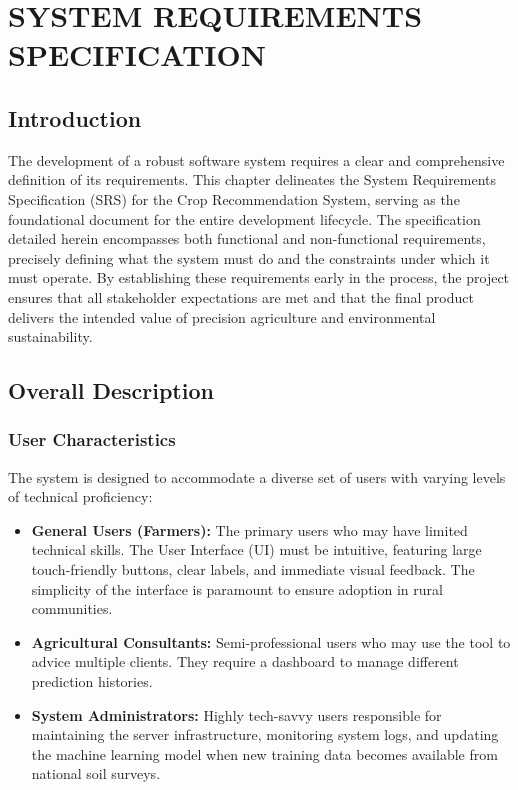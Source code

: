 \documentclass[12pt,a4paper]{report}
\begin{document}
\chapter{SYSTEM REQUIREMENTS SPECIFICATION}
\label{ch:3}

\section{Introduction}
\label{sec:3.1}
The development of a robust software system requires a clear and comprehensive definition of its requirements. This chapter delineates the System Requirements Specification (SRS) for the Crop Recommendation System, serving as the foundational document for the entire development lifecycle. The specification detailed herein encompasses both functional and non-functional requirements, precisely defining what the system must do and the constraints under which it must operate. By establishing these requirements early in the process, the project ensures that all stakeholder expectations are met and that the final product delivers the intended value of precision agriculture and environmental sustainability.

\section{Overall Description}
\subsection{User Characteristics}
The system is designed to accommodate a diverse set of users with varying levels of technical proficiency:
\begin{itemize}
    \item \textbf{General Users (Farmers):} The primary users who may have limited technical skills. The User Interface (UI) must be intuitive, featuring large touch-friendly buttons, clear labels, and immediate visual feedback. The simplicity of the interface is paramount to ensure adoption in rural communities.
    \item \textbf{Agricultural Consultants:} Semi-professional users who may use the tool to advice multiple clients. They require a dashboard to manage different prediction histories.
    \item \textbf{System Administrators:} Highly tech-savvy users responsible for maintaining the server infrastructure, monitoring system logs, and updating the machine learning model when new training data becomes available from national soil surveys.
\end{itemize}
\end{document}
